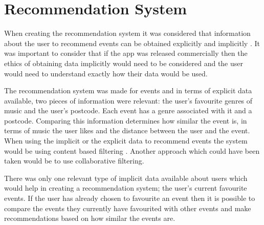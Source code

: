 \section{Recommendation System}
When creating the recommendation system it was considered that information about the user to recommend events can be obtained explicitly and implicitly \cite{ML}. It was important to consider that if the app was released commercially then the ethics of obtaining data implicitly would need to be considered and the user would need to understand exactly how their data would be used.

The recommendation system was made for events and in terms of explicit data available, two pieces of information were relevant: the user's favourite genres of music and the user's postcode. Each event has a genre associated with it and a postcode. Comparing this information determines how similar the event is, in terms of music the user likes and the distance between the user and the event. When using the implicit or the explicit data to recommend events the system would be using content based filtering \cite{san}. Another approach which could have been taken would be to use collaborative filtering. \cite{collab}

There was only one relevant type of implicit data available about users which would help in creating a recommendation system; the user's current favourite events. If the user has already chosen to favourite an event then it is possible to compare the events they currently have favourited with other events and make recommendations based on how similar the events are.

